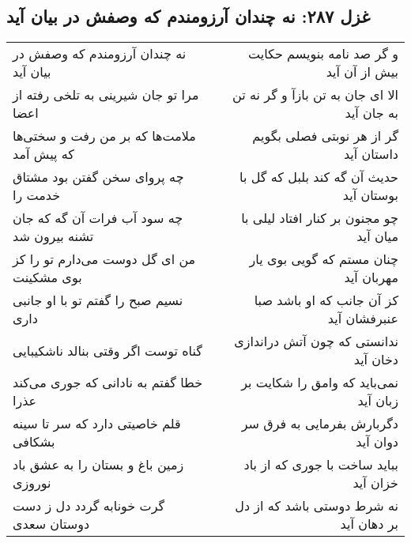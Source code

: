\begin{center}
\section*{غزل ۲۸۷: نه چندان آرزومندم که وصفش در بیان آید}
\label{sec:287}
\begin{longtable}{l p{0.5cm} r}
نه چندان آرزومندم که وصفش در بیان آید
&&
و گر صد نامه بنویسم حکایت بیش از آن آید
\\
مرا تو جان شیرینی به تلخی رفته از اعضا
&&
الا ای جان به تن بازآ و گر نه تن به جان آید
\\
ملامت‌ها که بر من رفت و سختی‌ها که پیش آمد
&&
گر از هر نوبتی فصلی بگویم داستان آید
\\
چه پروای سخن گفتن بود مشتاق خدمت را
&&
حدیث آن گه کند بلبل که گل با بوستان آید
\\
چه سود آب فرات آن گه که جان تشنه بیرون شد
&&
چو مجنون بر کنار افتاد لیلی با میان آید
\\
من ای گل دوست می‌دارم تو را کز بوی مشکینت
&&
چنان مستم که گویی بوی یار مهربان آید
\\
نسیم صبح را گفتم تو با او جانبی داری
&&
کز آن جانب که او باشد صبا عنبرفشان آید
\\
گناه توست اگر وقتی بنالد ناشکیبایی
&&
ندانستی که چون آتش دراندازی دخان آید
\\
خطا گفتم به نادانی که جوری می‌کند عذرا
&&
نمی‌باید که وامق را شکایت بر زبان آید
\\
قلم خاصیتی دارد که سر تا سینه بشکافی
&&
دگربارش بفرمایی به فرق سر دوان آید
\\
زمین باغ و بستان را به عشق باد نوروزی
&&
بباید ساخت با جوری که از باد خزان آید
\\
گرت خونابه گردد دل ز دست دوستان سعدی
&&
نه شرط دوستی باشد که از دل بر دهان آید
\\
\end{longtable}
\end{center}
